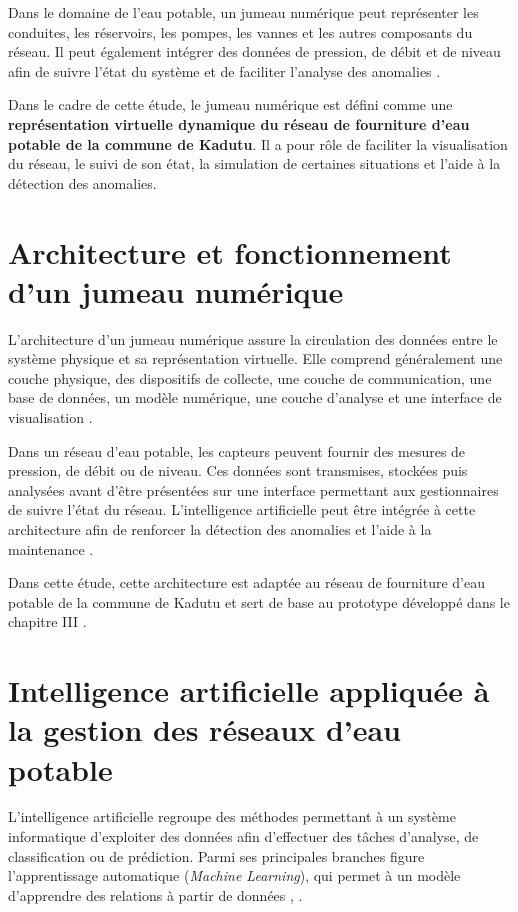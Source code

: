 Dans le domaine de l'eau potable, un jumeau numérique peut représenter
les conduites, les réservoirs, les pompes, les vannes et les autres
composants du réseau. Il peut également intégrer des données de pression,
de débit et de niveau afin de suivre l'état du système et de faciliter
l'analyse des anomalies \cite{ref20}.

Dans le cadre de cette étude, le jumeau numérique est défini comme une
\textbf{représentation virtuelle dynamique du réseau de fourniture d'eau
	potable de la commune de Kadutu}. Il a pour rôle de faciliter la
visualisation du réseau, le suivi de son état, la simulation de certaines
situations et l'aide à la détection des anomalies.

\section{Architecture et fonctionnement d'un jumeau numérique}
\label{architecture-et-fonctionnement-dun-jumeau-numerique}

L'architecture d'un jumeau numérique assure la circulation des données
entre le système physique et sa représentation virtuelle. Elle comprend
généralement une couche physique, des dispositifs de collecte, une
couche de communication, une base de données, un modèle numérique, une
couche d'analyse et une interface de visualisation \cite{ref60}.

Dans un réseau d'eau potable, les capteurs peuvent fournir des mesures
de pression, de débit ou de niveau. Ces données sont transmises,
stockées puis analysées avant d'être présentées sur une interface
permettant aux gestionnaires de suivre l'état du réseau. L'intelligence
artificielle peut être intégrée à cette architecture afin de renforcer
la détection des anomalies et l'aide à la maintenance \cite{ref61}.

Dans cette étude, cette architecture est adaptée au réseau de fourniture
d'eau potable de la commune de Kadutu et sert de base au prototype
développé dans le chapitre III \cite{ref65}.

\section{Intelligence artificielle appliquée à la gestion des réseaux d'eau potable}
\label{intelligence-artificielle-appliquee-a-la-gestion-des-reseaux-deau-potable}

L'intelligence artificielle regroupe des méthodes permettant à un système
informatique d'exploiter des données afin d'effectuer des tâches
d'analyse, de classification ou de prédiction. Parmi ses principales
branches figure l'apprentissage automatique (\emph{Machine Learning}),
qui permet à un modèle d'apprendre des relations à partir de données
\cite{ref67}, \cite{ref69}.

